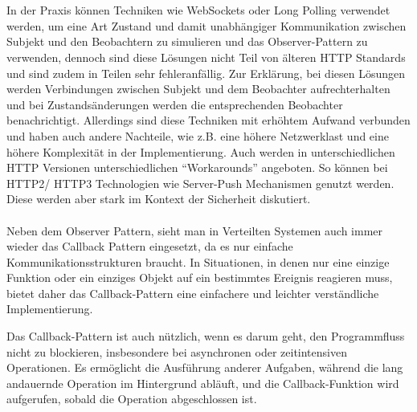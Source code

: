 \documentclass[../vs-script-first-v01.tex]{subfiles}
\begin{document}
\\\\
In der Praxis können Techniken wie WebSockets oder Long Polling verwendet werden, um eine Art Zustand und damit unabhängiger Kommunikation zwischen Subjekt und den Beobachtern zu simulieren und das Observer-Pattern zu verwenden, dennoch sind diese Lösungen nicht Teil von älteren HTTP Standards und sind zudem in Teilen sehr fehleranfällig. Zur Erklärung, bei diesen Lösungen werden Verbindungen zwischen Subjekt und dem Beobachter aufrechterhalten und bei Zustandsänderungen werden die entsprechenden Beobachter benachrichtigt. Allerdings sind diese Techniken mit erhöhtem Aufwand verbunden und haben auch andere Nachteile, wie z.B. eine höhere Netzwerklast und eine höhere Komplexität in der Implementierung. 
Auch werden in unterschiedlichen HTTP Versionen unterschiedlichen \enquote{Workarounds} angeboten. So können bei HTTP2/ HTTP3 Technologien wie Server-Push Mechanismen genutzt werden. Diese werden aber stark im Kontext der Sicherheit diskutiert. 
\\\\
Neben dem Observer Pattern, sieht man in Verteilten Systemen auch immer wieder das Callback Pattern eingesetzt, da es nur einfache Kommunikationsstrukturen braucht. In Situationen, in denen nur eine einzige Funktion oder ein einziges Objekt auf ein bestimmtes Ereignis reagieren muss, bietet daher das Callback-Pattern eine einfachere und leichter verständliche Implementierung.

Das Callback-Pattern ist auch nützlich, wenn es darum geht, den Programmfluss nicht zu blockieren, insbesondere bei asynchronen oder zeitintensiven Operationen. Es ermöglicht die Ausführung anderer Aufgaben, während die lang andauernde Operation im Hintergrund abläuft, und die Callback-Funktion wird aufgerufen, sobald die Operation abgeschlossen ist.
\end{document}
